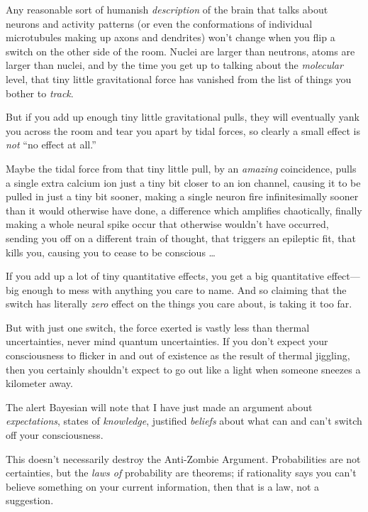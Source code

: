 {
 Any reasonable sort of humanish \textit{description} of the brain
that talks about neurons and activity patterns (or even the
conformations of individual microtubules making up axons and dendrites)
won't change when you flip a switch on the other side
of the room. Nuclei are larger than neutrons, atoms are larger than
nuclei, and by the time you get up to talking about the
\textit{molecular} level, that tiny little gravitational force has
vanished from the list of things you bother to \textit{track}.}

{
 But if you add up enough tiny little gravitational pulls, they
will eventually yank you across the room and tear you apart by tidal
forces, so clearly a small effect is \textit{not} ``no
effect at all.''}

{
 Maybe the tidal force from that tiny little pull, by an
\textit{amazing} coincidence, pulls a single extra calcium ion just a
tiny bit closer to an ion channel, causing it to be pulled in just a
tiny bit sooner, making a single neuron fire infinitesimally sooner
than it would otherwise have done, a difference which amplifies
chaotically, finally making a whole neural spike occur that otherwise
wouldn't have occurred, sending you off on a different
train of thought, that triggers an epileptic fit, that kills you,
causing you to cease to be conscious \ldots}

{
 If you add up a lot of tiny quantitative effects, you get a big
quantitative effect---big enough to mess with anything you care to
name. And so claiming that the switch has literally \textit{zero}
effect on the things you care about, is taking it too far.}

{
 But with just one switch, the force exerted is vastly less than
thermal uncertainties, never mind quantum uncertainties. If you
don't expect your consciousness to flicker in and out
of existence as the result of thermal jiggling, then you certainly
shouldn't expect to go out like a light when someone
sneezes a kilometer away.}

{
 The alert Bayesian will note that I have just made an argument
about \textit{expectations}, states of \textit{knowledge}, justified
\textit{beliefs} about what can and can't switch off
your consciousness.}

{
 This doesn't necessarily destroy the Anti-Zombie
Argument. Probabilities are not certainties, but the \textit{laws of}
probability are theorems; if rationality says you can't
believe something on your current information, then that is a law, not
a suggestion.}

